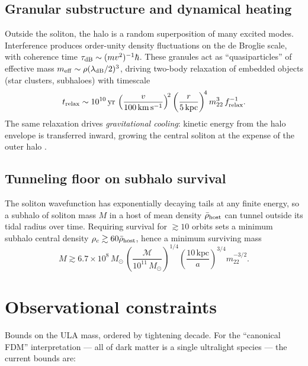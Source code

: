 \documentclass[12pt]{article}
\newcommand{\lambdadB}{\lambda_{\rm dB}}
\newcommand{\kpc}{\,\mathrm{kpc}}
\newcommand{\Msun}{\,M_\odot}
\newcommand{\kms}{\,\mathrm{km\,s^{-1}}}
\newcommand{\mtwtwo}{m_{22}}
\begin{document}
\subsection{Granular substructure and dynamical heating}

Outside the soliton, the halo is a random superposition of many
excited modes.  Interference produces order-unity density
fluctuations on the de Broglie scale, with coherence time
$\tau_{\rm dB}\sim(mv^2)^{-1}\hbar$.  These granules act as
``quasiparticles'' of effective mass
$m_{\rm eff}\sim\rho(\lambdadB/2)^3$, driving two-body relaxation of
embedded objects (star clusters, subhaloes) with timescale
\citep{Hui2017}
%
\begin{equation}
  t_{\rm relax}
   \sim 10^{10}\,{\rm yr}\,
     \left(\frac{v}{100\kms}\right)^{\!2}
     \left(\frac{r}{5\kpc}\right)^{\!4}
     \mtwtwo^{3}\,f_{\rm relax}^{-1}.
\end{equation}
%
The same relaxation drives \emph{gravitational cooling}: kinetic
energy from the halo envelope is transferred inward, growing the
central soliton at the expense of the outer halo
\citep{Mocz2017,Mocz2020}.

\subsection{Tunneling floor on subhalo survival}

The soliton wavefunction has exponentially decaying tails at any
finite energy, so a subhalo of soliton mass $M$ in a host of mean
density $\bar\rho_{\rm host}$ can tunnel outside its tidal radius over
time.  Requiring survival for $\gtrsim 10$ orbits sets a minimum
subhalo central density $\rho_c\gtrsim 60\bar\rho_{\rm host}$, hence a
minimum surviving mass \citep{Hui2017}
%
\begin{equation}
  M \gtrsim 6.7\times 10^{8}\Msun\,
    \left(\frac{\mathcal{M}}{10^{11}\Msun}\right)^{1/4}
    \left(\frac{10\kpc}{a}\right)^{3/4}
    \mtwtwo^{-3/2}.
\end{equation}

\section{Observational constraints}
\label{sec:constraints}

Bounds on the ULA mass, ordered by tightening decade.  For the
``canonical FDM'' interpretation --- all of dark matter is a single
ultralight species --- the current bounds are:
\end{document}
